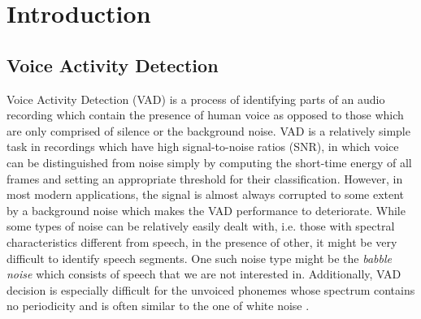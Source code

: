 
\chapter{Introduction} %

\label{Chapter1} %



\section{Voice Activity Detection}

Voice Activity Detection (VAD) is a process of identifying parts of an audio recording which contain the presence of human voice as opposed to those which are only comprised of silence or the background noise. VAD is a relatively simple task in recordings which have high signal-to-noise ratios (SNR), in which voice can be distinguished from noise simply by computing the short-time energy of all frames and setting an appropriate threshold for their classification. However, in most modern applications, the signal is almost always corrupted to some extent by a background noise which makes the VAD performance to deteriorate. While some types of noise can be relatively easily dealt with, i.e. those with spectral characteristics different from speech, in the presence of other, it might be very difficult to identify speech segments. One such noise type might be the \emph{babble noise} which consists of speech that we are not interested in. Additionally, VAD decision is especially difficult for the unvoiced phonemes \cite{Kondoz} whose spectrum contains no periodicity and is often similar to the one of white noise \cite{Michaelis}.

